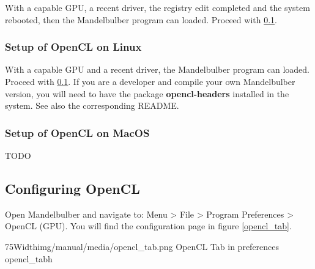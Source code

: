 With a capable GPU, a recent driver, the registry edit completed and the system rebooted, then the Mandelbulber program can loaded.
Proceed with \ref{configure-opencl}. 

\subsubsection{Setup of OpenCL on Linux}\label{setup-opencl-linux}
With a capable GPU and a recent driver, the Mandelbulber program can loaded.
Proceed with \ref{configure-opencl}. 
If you are a developer and compile your own Mandelbulber version,
you will need to have the package \textbf{opencl-headers} installed in the system.  
See also the corresponding README.

\subsubsection{Setup of OpenCL on MacOS}\label{setup-opencl-macos}
TODO

\subsection{Configuring OpenCL}\label{configure-opencl}
Open Mandelbulber and navigate to: Menu > File > Program Preferences > OpenCL (GPU).
You will find the configuration page in figure \ref{opencl_tab}.

\simpleImageWithCaption75Width{img/manual/media/opencl_tab.png}
{OpenCL Tab in preferences}
{opencl_tab}{h}


